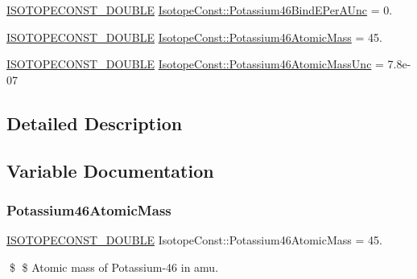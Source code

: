 \begin{DoxyCompactItemize}
\mbox{\hyperlink{group___isotope_const-_macros_ga8f45a7272ce02c0b4c65c44636ed719a}{I\+S\+O\+T\+O\+P\+E\+C\+O\+N\+S\+T\+\_\+\+D\+O\+U\+B\+LE}} \mbox{\hyperlink{group___isotope_const-_potassium-_k46_ga60e1b9f8dc87c49c68ee324545b73425}{Isotope\+Const\+::\+Potassium46\+Bind\+E\+Per\+A\+Unc}} = 0.
\item 
\mbox{\hyperlink{group___isotope_const-_macros_ga8f45a7272ce02c0b4c65c44636ed719a}{I\+S\+O\+T\+O\+P\+E\+C\+O\+N\+S\+T\+\_\+\+D\+O\+U\+B\+LE}} \mbox{\hyperlink{group___isotope_const-_potassium-_k46_gafee7de296a0ba3ccce1c9b84202b428c}{Isotope\+Const\+::\+Potassium46\+Atomic\+Mass}} = 45.
\item 
\mbox{\hyperlink{group___isotope_const-_macros_ga8f45a7272ce02c0b4c65c44636ed719a}{I\+S\+O\+T\+O\+P\+E\+C\+O\+N\+S\+T\+\_\+\+D\+O\+U\+B\+LE}} \mbox{\hyperlink{group___isotope_const-_potassium-_k46_gaee3b6fde1e81fc1a85ecdd6f60b83388}{Isotope\+Const\+::\+Potassium46\+Atomic\+Mass\+Unc}} = 7.\+8e-\/07
\end{DoxyCompactItemize}


\subsection{Detailed Description}


\subsection{Variable Documentation}
\mbox{\label{group___isotope_const-_potassium-_k46_gafee7de296a0ba3ccce1c9b84202b428c}} 
\subsubsection{\texorpdfstring{Potassium46\+Atomic\+Mass}{Potassium46AtomicMass}}
{\footnotesize\ttfamily \mbox{\hyperlink{group___isotope_const-_macros_ga8f45a7272ce02c0b4c65c44636ed719a}{I\+S\+O\+T\+O\+P\+E\+C\+O\+N\+S\+T\+\_\+\+D\+O\+U\+B\+LE}} Isotope\+Const\+::\+Potassium46\+Atomic\+Mass = 45.}

\$ \$ Atomic mass of Potassium-\/46 in amu. \mbox{\label{group___isotope_const-_potassium-_k46_gaee3b6fde1e81fc1a85ecdd6f60b83388}} 

